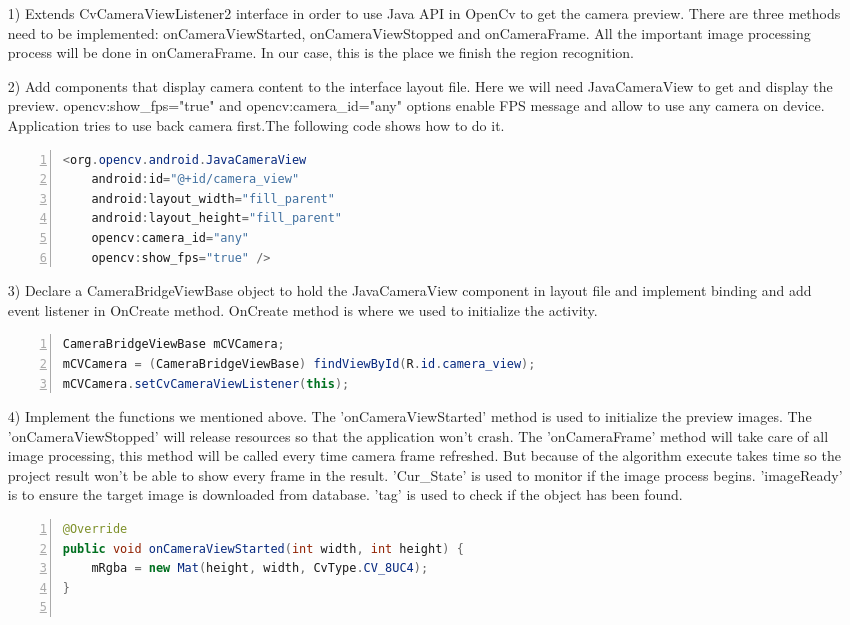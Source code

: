 \begin{enumerate}
\item[1)] Extends CvCameraViewListener2 interface in order to use Java API in OpenCv to get the camera preview. There are three methods need to be implemented: onCameraViewStarted, onCameraViewStopped and onCameraFrame. All the important image processing process will be done in onCameraFrame. In our case, this is the place we finish the region recognition.
\item[2)] Add components that display camera content to the interface layout file. Here we will need JavaCameraView to get and display the preview. opencv:show\_fps="true" and opencv:camera\_id="any" options enable FPS message and allow to use any camera on device. Application tries to use back camera first.The following code shows how to do it.
\begin{lstlisting}[language={java},
        numbers=left,basicstyle=\footnotesize\ttfamily,breaklines=true,xleftmargin=.15\textwidth, xrightmargin=.15\textwidth] 
<org.opencv.android.JavaCameraView
    android:id="@+id/camera_view"
    android:layout_width="fill_parent"
    android:layout_height="fill_parent"
    opencv:camera_id="any"
    opencv:show_fps="true" />
\end{lstlisting}
\item[3)] Declare a CameraBridgeViewBase object to hold the JavaCameraView component in layout file and implement binding and add event listener in OnCreate method. OnCreate method is where we used to initialize the activity.
\begin{lstlisting}[language={java},
        numbers=left,basicstyle=\footnotesize\ttfamily,breaklines=true,xleftmargin=.05\textwidth, xrightmargin=.05\textwidth] 
CameraBridgeViewBase mCVCamera;
mCVCamera = (CameraBridgeViewBase) findViewById(R.id.camera_view);
mCVCamera.setCvCameraViewListener(this);
\end{lstlisting}
\item[4)] Implement the functions we mentioned above. The 'onCameraViewStarted' method is used to initialize the preview images. The 'onCameraViewStopped' will release resources so that the application won't crash. The 'onCameraFrame' method will take care of all image processing, this method will be called every time camera frame refreshed. But because of the algorithm execute takes time so the project result won't be able to show every frame in the result. 'Cur\_State' is used to monitor if the image process begins. 'imageReady' is to ensure the target image is downloaded from database. 'tag' is used to check if the object has been found.
\begin{lstlisting}[language={java},
        numbers=left,basicstyle=\footnotesize\ttfamily,breaklines=true,xleftmargin=.05\textwidth, xrightmargin=.05\textwidth] 
@Override
public void onCameraViewStarted(int width, int height) {
    mRgba = new Mat(height, width, CvType.CV_8UC4);
}


\end{lstlisting}
\end{enumerate}
